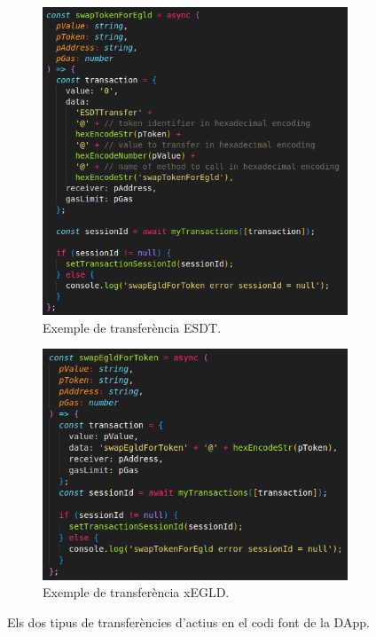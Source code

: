 \documentclass[11pt,a4paper]{article}
\begin{document}
\begin{figure}[!htb]
\begin{subfigure}[b]{0.47\textwidth}
  \includegraphics[width=\linewidth]{imp-esdttransfer.png}
  \caption{Exemple de transferència ESDT.}\label{fig:impesdttransfer}
\end{subfigure}\hfill
\begin{subfigure}[b]{0.47\textwidth}
  \includegraphics[width=\linewidth]{imp-egldtransfer.png}
  \caption{Exemple de transferència xEGLD.}\label{fig:screentrade}
\end{subfigure}\hfill
\caption{Els dos tipus de transferències d'actius en el codi font de la DApp.}
\label{fig:tipustransfer}
\end{figure}
\end{document}
